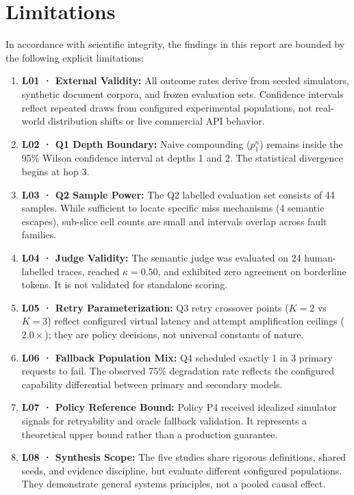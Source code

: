 \section{Limitations}

In accordance with scientific integrity, the findings in this report are bounded by the following explicit limitations:

\begin{enumerate}
    \item \textbf{L01 · External Validity:} All outcome rates derive from seeded simulators, synthetic document corpora, and frozen evaluation sets. Confidence intervals reflect repeated draws from configured experimental populations, not real-world distribution shifts or live commercial API behavior.
    \item \textbf{L02 · Q1 Depth Boundary:} Naive compounding ($p_1^n$) remains inside the 95\% Wilson confidence interval at depths 1 and 2. The statistical divergence begins at hop 3.
    \item \textbf{L03 · Q2 Sample Power:} The Q2 labelled evaluation set consists of 44 samples. While sufficient to locate specific miss mechanisms (4 semantic escapes), sub-slice cell counts are small and intervals overlap across fault families.
    \item \textbf{L04 · Judge Validity:} The semantic judge was evaluated on 24 human-labelled traces, reached $\kappa=0.50$, and exhibited zero agreement on borderline tokens. It is not validated for standalone scoring.
    \item \textbf{L05 · Retry Parameterization:} Q3 retry crossover points ($K=2$ vs $K=3$) reflect configured virtual latency and attempt amplification ceilings ($2.0\times$); they are policy decisions, not universal constants of nature.
    \item \textbf{L06 · Fallback Population Mix:} Q4 scheduled exactly 1 in 3 primary requests to fail. The observed 75\% degradation rate reflects the configured capability differential between primary and secondary models.
    \item \textbf{L07 · Policy Reference Bound:} Policy P4 received idealized simulator signals for retryability and oracle fallback validation. It represents a theoretical upper bound rather than a production guarantee.
    \item \textbf{L08 · Synthesis Scope:} The five studies share rigorous definitions, shared seeds, and evidence discipline, but evaluate different configured populations. They demonstrate general systems principles, not a pooled causal effect.
\end{enumerate}

